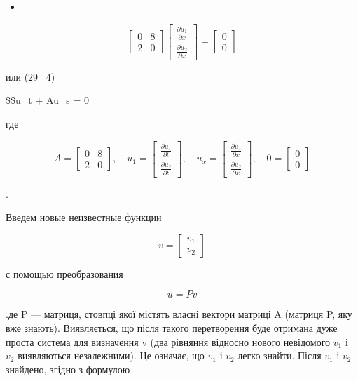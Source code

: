 \documentclass[
  ukrainian,
]{article}
\providecommand{\tightlist}{%
  \setlength{\itemsep}{0pt}\setlength{\parskip}{0pt}}
\begin{document}
\begin{itemize}
\tightlist
\item
\end{itemize}

\[
\begin{bmatrix} 0 & 8 \\ 2 & 0 \end{bmatrix}
\begin{bmatrix} \frac{\partial u_1}{\partial x} \\ \frac{\partial u_2}{\partial x} \end{bmatrix}
=
\begin{bmatrix} 0 \\ 0 \end{bmatrix}
\]

или (29 ~4)

\$\$u\_t + Au\_s = 0

где

\[
A =
\begin{bmatrix} 0 & 8 \\ 2 & 0 \end{bmatrix}
, \quad u_1 =
\begin{bmatrix} \frac{\partial u_1}{\partial t} \\ \frac{\partial u_2}{\partial t} \end{bmatrix}
, \quad u_x =
\begin{bmatrix} \frac{\partial u_1}{\partial x} \\ \frac{\partial u_2}{\partial x} \end{bmatrix}
, \quad 0 =
\begin{bmatrix} 0 \\ 0 \end{bmatrix}
\]

.

Введем новые неизвестные функции

\[
v =
\begin{bmatrix} v_1 \\ v_2 \end{bmatrix}
\]

с помощью преобразования

\[
u = Pv
\]

.де P --- матриця, стовпці якої містять власні вектори матриці A
(матриця P, яку вже знають). Виявляється, що після такого перетворення
буде отримана дуже проста система для визначення v (два рівняння
відносно нового невідомого \(v_1\) і \(v_2\) виявляються незалежними).
Це означає, що \(v_1\) і \(v_2\) легко знайти. Після \(v_1\) і \(v_2\)
знайдено, згідно з формулою
\end{document}
